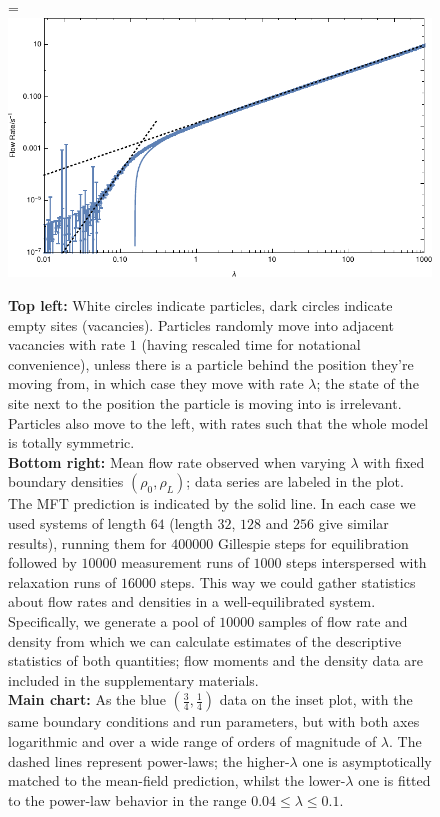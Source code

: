 \documentclass[
reprint,
 amsmath,amssymb,
 aps,
 prl,
]{revtex4-1}
\begin{document}
\begin{figure}[h!]
\vspace{1em}
\caption{\label{fig:lambdaScans} \textbf{Top left:} White circles indicate particles, dark circles indicate empty sites (vacancies). Particles randomly move into adjacent vacancies with rate $1$ (having rescaled time for notational convenience), unless there is a
particle behind the position they're moving from, in which case they move with rate $\lambda$; the state of the site next to the position the particle is moving into is irrelevant.
Particles also move to the left, with rates such that the whole model is totally symmetric.\\
\textbf{Bottom right:} Mean flow rate observed when varying $\lambda$ with fixed boundary densities $(\rho_0, \rho_L)$; data series are labeled in the plot.
The MFT prediction is indicated by the solid line.
In each case we used systems of length $64$ (length $32$, $128$ and $256$ give similar results),
running them for $400000$ Gillespie steps for equilibration followed by $10000$ measurement runs of $1000$ steps interspersed with relaxation runs of $16000$
steps. This way we could gather statistics about flow rates and densities in a well-equilibrated system. Specifically, we generate a pool of $10000$ samples of flow rate and density
from which we can calculate estimates of the descriptive statistics of both quantities; flow moments and the density data are included in the supplementary materials.\\
\textbf{Main chart:} As the blue $\left( \frac{3}{4} , \frac{1}{4} \right)$ data on the inset plot, with the same boundary conditions and run parameters, but with both axes logarithmic and over a wide range of orders of magnitude of $\lambda$.
The dashed lines represent power-laws; the higher-$\lambda$ one is asymptotically matched to the mean-field prediction, whilst the lower-$\lambda$ one is fitted to the power-law behavior in the range $0.04 \le \lambda \le 0.1$.
\vspace{1em}}
=\hbox{\includegraphics[width=\linewidth]{logFlowRates}}

\end{figure}
\end{document}
